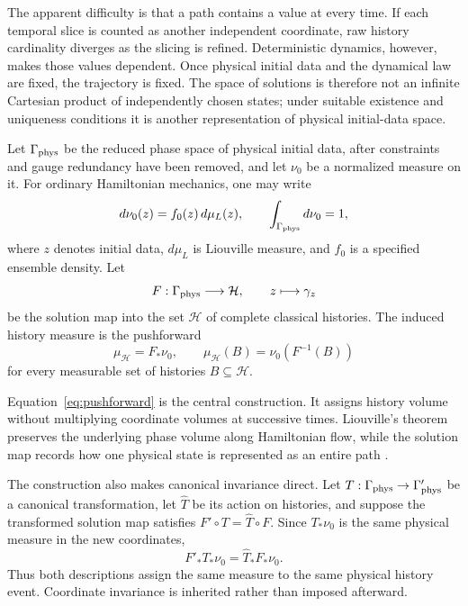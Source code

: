 \documentclass[10pt]{article}
\begin{document}
The apparent difficulty is that a path contains a value at every time.  If
each temporal slice is counted as another independent coordinate, raw history
cardinality diverges as the slicing is refined.  Deterministic dynamics,
however, makes those values dependent.  Once physical initial data and the
dynamical law are fixed, the trajectory is fixed.  The space of solutions is
therefore not an infinite Cartesian product of independently chosen states;
under suitable existence and uniqueness conditions it is another
representation of physical initial-data space.

Let $\Gamma_{\rm phys}$ be the reduced phase space of physical initial data,
after constraints and gauge redundancy have been removed, and let
$\nu_0$ be a normalized measure on it.  For ordinary Hamiltonian mechanics,
one may write
\begin{equation}
d\nu_0(z)=f_0(z)\,d\mu_L(z),
\qquad
\int_{\Gamma_{\rm phys}}d\nu_0=1,
\label{eq:initial-measure}
\end{equation}
where $z$ denotes initial data, $d\mu_L$ is Liouville measure, and $f_0$ is a
specified ensemble density.  Let
\begin{equation}
F:\Gamma_{\rm phys}\longrightarrow\mathcal H,
\qquad z\longmapsto\gamma_z
\label{eq:solution-map}
\end{equation}
be the solution map into the set $\mathcal H$ of complete classical histories.
The induced history measure is the pushforward
\begin{equation}
\boxed{\mu_{\mathcal H}=F_*\nu_0,}
\qquad
\mu_{\mathcal H}(B)=\nu_0(F^{-1}(B))
\label{eq:pushforward}
\end{equation}
for every measurable set of histories $B\subseteq\mathcal H$.

Equation~\eqref{eq:pushforward} is the central construction.  It assigns
history volume without multiplying coordinate volumes at successive times.
Liouville's theorem preserves the underlying phase volume along Hamiltonian
flow, while the solution map records how one physical state is represented as
an entire path \citep{Liouville1838,Arnold1989}.

The construction also makes canonical invariance direct.  Let
$T:\Gamma_{\rm phys}\to\Gamma'_{\rm phys}$ be a canonical transformation,
let $\widehat T$ be its action on histories, and suppose the transformed
solution map satisfies $F'\circ T=\widehat T\circ F$.  Since
$T_*\nu_0$ is the same physical measure in the new coordinates,
\begin{equation}
F'_*T_*\nu_0
=\widehat T_*F_*\nu_0.
\label{eq:canonical-pushforward}
\end{equation}
Thus both descriptions assign the same measure to the same physical history
event.  Coordinate invariance is inherited rather than imposed afterward.
\end{document}
